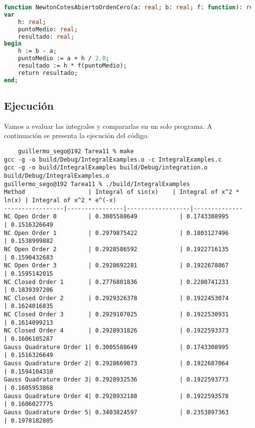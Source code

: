 \documentclass{article}
\begin{document}
\begin{lstlisting}[language=Pascal, caption={Newton-Cotes Abierto de orden 0 (Punto Medio)}]
function NewtonCotesAbiertoOrdenCero(a: real; b: real; f: function): real;
var
    h: real;
    puntoMedio: real;
    resultado: real;
begin
    h := b - a;
    puntoMedio := a + h / 2.0;
    resultado := h * f(puntoMedio);
    return resultado;
end;
\end{lstlisting}


\subsection{Ejecución}
Vamos a evaluar las integrales y compararlas en un solo programa. A continuación se presenta la ejecución del código.

\begin{lstlisting}
    guillermo_sego@192 Tarea11 % make
gcc -g -o build/Debug/IntegralExamples.o -c IntegralExamples.c
gcc -g -o build/IntegralExamples build/Debug/integration.o build/Debug/IntegralExamples.o
guillermo_sego@192 Tarea11 % ./build/IntegralExamples
Method                  | Integral of sin(x)    | Integral of x^2 * ln(x) | Integral of x^2 * e^(-x)
-----------------|----------------|------------------|--------------
NC Open Order 0         | 0.3005588649            | 0.1743308995               | 0.1516326649
NC Open Order 1         | 0.2979875422            | 0.1803127496               | 0.1538999882
NC Open Order 2         | 0.2928586592            | 0.1922716135               | 0.1590432683
NC Open Order 3         | 0.2928692281            | 0.1922678867               | 0.1595142015
NC Closed Order 1       | 0.2776801836            | 0.2280741233               | 0.1839397206
NC Closed Order 2       | 0.2929326378            | 0.1922453074               | 0.1624016835
NC Closed Order 3       | 0.2929107025            | 0.1922530931               | 0.1614099213
NC Closed Order 4       | 0.2928931826            | 0.1922593373               | 0.1606105287
Gauss Quadrature Order 1| 0.3005588649            | 0.1743308995               | 0.1516326649
Gauss Quadrature Order 2| 0.2928669073            | 0.1922687064               | 0.1594104310
Gauss Quadrature Order 3| 0.2928932536            | 0.1922593773               | 0.1605953868
Gauss Quadrature Order 4| 0.2928932188            | 0.1922593578               | 0.1606027775
Gauss Quadrature Order 5| 0.3403824597            | 0.2353897363               | 0.1978182805
\end{lstlisting}
\end{document}
